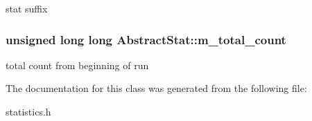 \label{classAbstractStat_af7f98a59844e9417602d28b4849ef105}
stat suffix \hypertarget{classAbstractStat_a85a84b70539aea2b1318bd45b4d48104}{
\subsubsection[{m\_\-total\_\-count}]{\setlength{\rightskip}{0pt plus 5cm}unsigned long long {\bf AbstractStat::m\_\-total\_\-count}}}
\label{classAbstractStat_a85a84b70539aea2b1318bd45b4d48104}
total count from beginning of run 

The documentation for this class was generated from the following file:\begin{DoxyCompactItemize}
\item 
statistics.h\end{DoxyCompactItemize}
